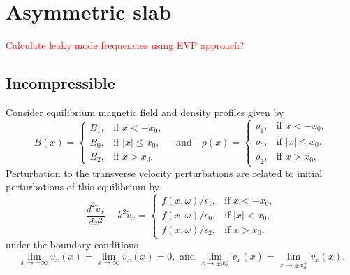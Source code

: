 \documentclass[12pt, draft]{../style-files/ociamthesis}
\begin{document}
\section{Asymmetric slab}
\label{sec: IVP slab}

\textcolor{red}{Calculate leaky mode frequencies using EVP approach?}

\subsection{Incompressible}

Consider equilibrium magnetic field and density profiles given by
\begin{equation}
B(x)=
\begin{cases}
B_1, & \text{if  }x<-x_0, \\
B_0, & \text{if }|x|\leq{x_0}, \\
B_2, & \text{if  }x>x_0,
\end{cases}
\quad \text{and} \quad
\rho(x)=
\begin{cases}
\rho_1, & \text{if  }x<-x_0, \\
\rho_0, & \text{if }|x|\leq{x_0}, \\
\rho_2, & \text{if  }x>x_0,
\end{cases}
\end{equation}
Perturbation to the transverse velocity perturbations are related to initial perturbations of this equilibrium by
\begin{equation}
\frac{d^2\tilde{v}_x}{dx^2} - k^2\tilde{v}_x = 
\begin{cases}
f(x, \omega)/\epsilon_1, & \text{if  } x<-x_0,\\
f(x, \omega)/\epsilon_0, & \text{if  } |x|<x_0,\\
f(x, \omega)/\epsilon_2, & \text{if  } x>x_0,
\end{cases}
\label{ivp gov slab 2}
\end{equation}
under the boundary conditions
\begin{equation}
\lim_{x \to -\infty}\tilde{v}_x(x) = \lim_{x \to \infty}\tilde{v}_x(x) = 0, \text{ and } \lim_{x \to \pm x_0^-}\tilde{v}_x(x) = \lim_{x \to \pm x_0^+}\tilde{v}_x(x).
\label{ivp slab BC}
\end{equation}
\end{document}
